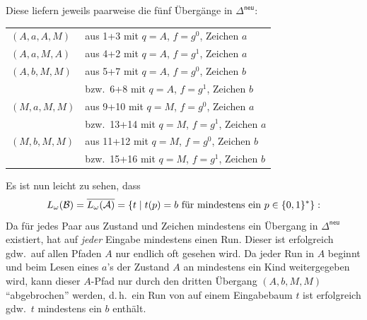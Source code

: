 \documentclass[fontsize=11pt, twoside=false, numbers=autoenddot]{scrbook}
\begin{document}
%
Diese liefern jeweils paarweise die fünf Übergänge in $\Delta^{\textsf{neu}}$:
%
\begin{center}
  \begin{tabular}{@{}ll@{}}
    $(A,a,A,M)$ & aus 1+3 mit $q=A$, $f=g^0$, Zeichen $a$ \\
    $(A,a,M,A)$ & aus 4+2 mit $q=A$, $f=g^1$, Zeichen $a$ \\
    $(A,b,M,M)$ & aus 5+7 mit $q=A$, $f=g^0$, Zeichen $b$ \\
                & bzw.\ 6+8 mit $q=A$, $f=g^1$, Zeichen $b$ \\
    $(M,a,M,M)$ & aus 9+10 mit $q=M$, $f=g^0$, Zeichen $a$ \\
                & bzw.\ 13+14 mit $q=M$, $f=g^1$, Zeichen $a$ \\
    $(M,b,M,M)$ & aus 11+12 mit $q=M$, $f=g^0$, Zeichen $b$ \\
                & bzw.\ 15+16 mit $q=M$, $f=g^1$, Zeichen $b$ \\
  \end{tabular}
\end{center}
%
Es ist nun leicht zu sehen, dass
\[
  L_\omega(\mathcal{B}) = \overline{L_\omega(\mathcal{A})} = \{t \mid t(p) = b \text{~für mindestens ein~} p \in \{0,1\}^*\}:
\]
Da für jedes Paar aus Zustand und Zeichen mindestens ein Übergang in $\Delta^{\textsf{neu}}$ existiert,
hat \Bmc auf \emph{jeder} Eingabe mindestens einen Run. Dieser ist erfolgreich
gdw.\ auf allen Pfaden $A$ nur endlich oft gesehen wird.
Da jeder Run in $A$ beginnt und beim Lesen eines $a$'s der Zustand $A$ an mindestens ein Kind weitergegeben wird,
kann dieser $A$-Pfad nur durch den dritten Übergang $(A,b,M,M)$ "`abgebrochen"' werden,
d.\,h.\ ein Run von \Bmc auf einem Eingabebaum $t$ ist erfolgreich gdw.\ 
$t$ mindestens ein $b$ enthält.
\end{document}
